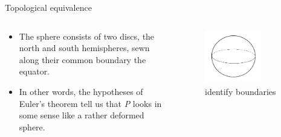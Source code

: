 \documentclass{beamer}
\begin{document}
\begin{frame}{Topological equivalence}
  \begin{columns}
    \begin{column}{0.6\textwidth}
      \begin{block}{}
        \begin{itemize}
        \item The sphere consists of two discs, the north and south hemispheres, sewn along their common boundary the equator.
        \item In other words, the hypotheses of Euler's theorem tell us that \textsl{P} looks in some sense like a rather deformed sphere.
        \end{itemize}
      \end{block}
    \end{column}
    \begin{column}{0.4\textwidth}
      \begin{figure}
        \centering
        \includegraphics[width=0.7\textwidth]{figure_1_7_b.png}
        \caption{identify boundaries}
      \end{figure}
    \end{column}
  \end{columns}
\end{frame}
\end{document}
